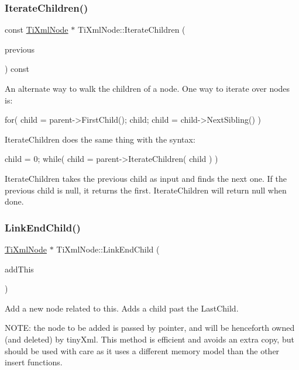 \subsubsection{\texorpdfstring{Iterate\+Children()}{IterateChildren()}}
{\footnotesize\ttfamily const \hyperlink{class_ti_xml_node}{Ti\+Xml\+Node} $\ast$ Ti\+Xml\+Node\+::\+Iterate\+Children (\begin{DoxyParamCaption}\item[{const \hyperlink{class_ti_xml_node}{Ti\+Xml\+Node} $\ast$}]{previous }\end{DoxyParamCaption}) const}

An alternate way to walk the children of a node. One way to iterate over nodes is\+: \begin{DoxyVerb}    for( child = parent->FirstChild(); child; child = child->NextSibling() )
\end{DoxyVerb}


Iterate\+Children does the same thing with the syntax\+: \begin{DoxyVerb}    child = 0;
    while( child = parent->IterateChildren( child ) )
\end{DoxyVerb}


Iterate\+Children takes the previous child as input and finds the next one. If the previous child is null, it returns the first. Iterate\+Children will return null when done. \hypertarget{class_ti_xml_node_a1a881212554b759865f6cac79a851d38}{}\label{class_ti_xml_node_a1a881212554b759865f6cac79a851d38} 
\subsubsection{\texorpdfstring{Link\+End\+Child()}{LinkEndChild()}}
{\footnotesize\ttfamily \hyperlink{class_ti_xml_node}{Ti\+Xml\+Node} $\ast$ Ti\+Xml\+Node\+::\+Link\+End\+Child (\begin{DoxyParamCaption}\item[{\hyperlink{class_ti_xml_node}{Ti\+Xml\+Node} $\ast$}]{add\+This }\end{DoxyParamCaption})}

Add a new node related to this. Adds a child past the Last\+Child.

N\+O\+TE\+: the node to be added is passed by pointer, and will be henceforth owned (and deleted) by tiny\+Xml. This method is efficient and avoids an extra copy, but should be used with care as it uses a different memory model than the other insert functions.

